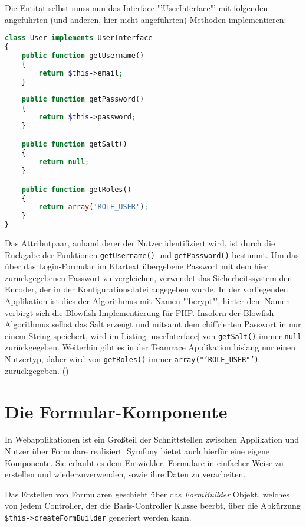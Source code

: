 \documentclass[12pt]{report}
\begin{document}
Die Entität selbst muss nun das Interface "'UserInterface"' mit folgenden angeführten (und anderen, hier nicht angeführten) Methoden implementieren:

\begin{lstlisting}[language=php, caption=Auszug aus src/TeamRace/WebBundle/Entity/User.php, showstringspaces=false, label=userInterface]
class User implements UserInterface
{
    public function getUsername()
    {
    	return $this->email;
    }
    
    public function getPassword()
    {
        return $this->password;
    }

    public function getSalt()
    {
    	return null;
    }

    public function getRoles()
    {
    	return array('ROLE_USER');
    }
}
\end{lstlisting}
Das Attributpaar, anhand derer der Nutzer identifiziert wird, ist durch die Rückgabe der Funktionen \texttt{getUsername()} und \texttt{getPassword()} bestimmt. Um das über das Login-Formular im Klartext übergebene Passwort mit dem hier zurückgegebenen Passwort zu vergleichen, verwendet das Sicherheitssystem den Encoder, der in der Konfigurationsdatei angegeben wurde. In der vorliegenden Applikation ist dies der Algorithmus mit Namen "'bcrypt"', hinter dem Namen verbirgt sich die Blowfish Implementierung für PHP. Insofern der Blowfish Algorithmus selbst das Salt erzeugt und mitsamt dem chiffrierten Passwort in nur einem String speichert, wird im Listing \ref{userInterface} von \texttt{getSalt()} immer \texttt{null} zurückgegeben.
Weiterhin gibt es in der Teamrace Applikation bislang nur einen Nutzertyp, daher wird von \texttt{getRoles()} immer \texttt{array("'ROLE\_USER"')} zurückgegeben. (\cite{sf2:Security})

\section{Die Formular-Komponente}
In Webapplikationen ist ein Großteil der Schnittstellen zwischen Applikation und Nutzer über Formulare realisiert. Symfony bietet auch hierfür eine eigene Komponente. Sie erlaubt es dem Entwickler, Formulare in einfacher Weise zu erstellen und wiederzuverwenden, sowie ihre Daten zu verarbeiten.

Das Erstellen von Formularen geschieht über das \emph{FormBuilder} Objekt, welches von jedem Controller, der die Basis-Controller Klasse beerbt, über die Abkürzung \texttt{\$this->createFormBuilder} generiert werden kann.
\end{document}
